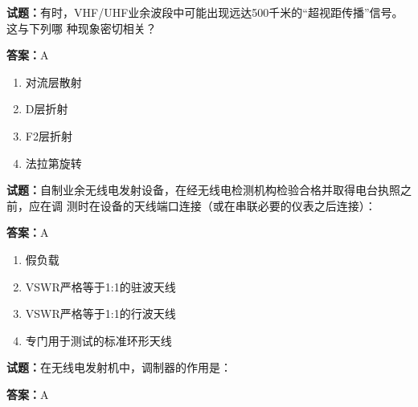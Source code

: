 \documentclass{ctexbook}
\begin{document}





\vspace{1em}

\textbf{试题：}有时，VHF/UHF业余波段中可能出现远达500千米的“超视距传播”信号。这与下列哪
种现象密切相关？ 

\textbf{答案：}A 

\begin{enumerate}[leftmargin=3em]
  \item 对流层散射 

  \item D层折射 

  \item F2层折射 

  \item 法拉第旋转 

\end{enumerate}





\vspace{1em}

\textbf{试题：}自制业余无线电发射设备，在经无线电检测机构检验合格并取得电台执照之前，应在调
测时在设备的天线端口连接（或在串联必要的仪表之后连接）： 

\textbf{答案：}A 

\begin{enumerate}[leftmargin=3em]
  \item 假负载 

  \item VSWR严格等于1:1的驻波天线 

  \item VSWR严格等于1:1的行波天线 

  \item 专门用于测试的标准环形天线 

\end{enumerate}





\vspace{1em}

\textbf{试题：}在无线电发射机中，调制器的作用是： 

\textbf{答案：}A 
\end{document}
